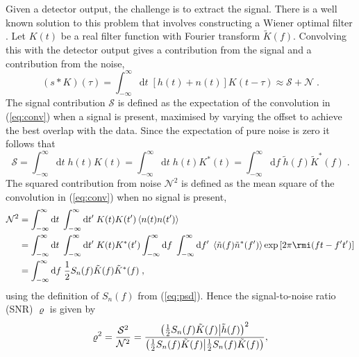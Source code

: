 Given a detector output, the challenge is to extract the signal. There is a well known solution to this problem that involves constructing a Wiener optimal filter \citep{Wiener49}. Let $K(t)$ be a real filter function with Fourier transform $\tilde{K}(f)$. Convolving this with the detector output gives a contribution from the signal and a contribution from the noise,
\begin{equation}\label{eq:conv}
\left(s*K\right)(\tau) = \int_{-\infty}^{\infty}\mathrm{d}t\;\left[h(t)+n(t)\right]K(t-\tau) \approx \mathcal{S} + \mathcal{N} \; .
\end{equation}
The signal contribution $\mathcal{S}$ is defined as the expectation of the convolution in (\ref{eq:conv}) when a signal is present, maximised by varying the offset to achieve the best overlap with the data. Since the expectation of pure noise is zero it follows that
\begin{equation}
\mathcal{S} = \int_{-\infty}^{\infty}\mathrm{d}t\;h(t)K(t)=\int_{-\infty}^{\infty}\mathrm{d}t\;h(t)K^{*}(t)=\int_{-\infty}^{\infty}\mathrm{d}f\; \tilde{h}(f)\tilde{K}^{*}(f) \; .
\end{equation}
The squared contribution from noise $\mathcal{N}^{2}$ is defined as the mean square of the convolution in (\ref{eq:conv}) when no signal is present,
\begin{eqnarray} 
\mathcal{N}^{2} &= \int_{-\infty}^{\infty}\mathrm{d}t\;\int_{-\infty}^{\infty}\mathrm{d}t'\;K(t)K(t')\left<n(t)n(t')\right> \nonumber \\
 &= \int_{-\infty}^{\infty}\mathrm{d}t\;\int_{-\infty}^{\infty}\mathrm{d}t'\;K(t)K^{*}(t')\int_{-\infty}^{\infty}\mathrm{d}f\;\int_{-\infty}^{\infty}\mathrm{d}f'\;\left<\tilde{n}(f)\tilde{n}^{*}(f')\right>\exp\left[2\pi\rmi(ft-f't')\right]\nonumber \\
 &= \int_{-\infty}^{\infty}\mathrm{d}f \; \frac{1}{2}S_{n}(f)\tilde{K}(f)\tilde{K}^{*}(f) \; ,
 \end{eqnarray}
using the definition of $S_{n}(f)$ from (\ref{eq:psd}). Hence the signal-to-noise ratio (SNR) $\varrho$ is given by
\begin{equation}\label{eq:SNRinnerprod} 
\varrho^{2} = \frac{\mathcal{S}^{2}}{\mathcal{N}^{2}}= \frac{\left({\frac{1}{2}S_{n}(f)\tilde{K}(f)}\middle|{\tilde{h}(f)}\right)^{2}}{\left({\frac{1}{2}S_{n}(f)\tilde{K}(f)}\middle|{\frac{1}{2}S_{n}(f)\tilde{K}(f)}\right)},
\end{equation}
